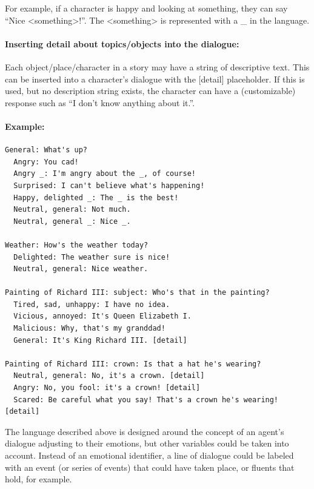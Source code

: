 \documentclass[11pt]{report}
\begin{document}
For example, if a character is happy and looking at something, they can say “Nice <something>!”. The <something> is represented with a _ in the language.

\paragraph{Inserting detail about topics/objects into the dialogue:}

Each object/place/character in a story may have a string of descriptive text. This can be inserted into a character’s dialogue with the [detail] placeholder. If this is used, but no description string exists, the character can have a (customizable) response such as “I don’t know anything about it.”.

\paragraph{Example:}

\begin{lstlisting}[showstringspaces=false]
General: What's up?
  Angry: You cad!
  Angry _: I'm angry about the _, of course!
  Surprised: I can't believe what's happening!
  Happy, delighted _: The _ is the best!
  Neutral, general: Not much.
  Neutral, general _: Nice _.

Weather: How's the weather today?
  Delighted: The weather sure is nice!
  Neutral, general: Nice weather.

Painting of Richard III: subject: Who's that in the painting?
  Tired, sad, unhappy: I have no idea.
  Vicious, annoyed: It's Queen Elizabeth I.
  Malicious: Why, that's my granddad!
  General: It's King Richard III. [detail]

Painting of Richard III: crown: Is that a hat he's wearing?
  Neutral, general: No, it's a crown. [detail]
  Angry: No, you fool: it's a crown! [detail]
  Scared: Be careful what you say! That's a crown he's wearing! [detail]
\end{lstlisting}

The language described above is designed around the concept of an agent's
dialogue adjusting to their emotions, but other variables could be taken into
account. Instead of an emotional identifier, a line of dialogue could be labeled
with an event (or series of events) that could have taken place, or fluents that
hold, for example.
\end{document}

